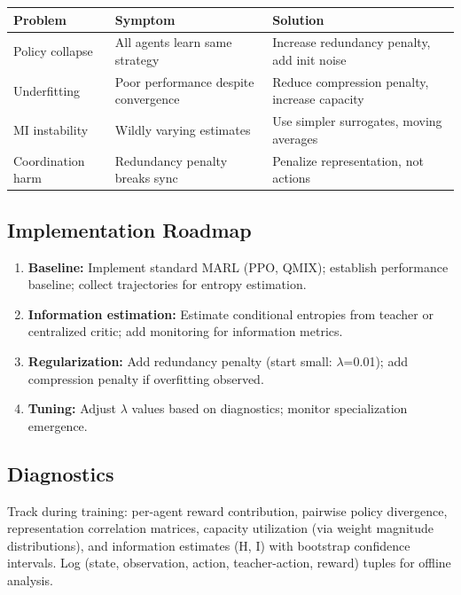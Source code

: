\documentclass[10pt, letterpaper]{article}
\begin{document}
\begin{center}
\begin{tabular}{lll}
\toprule
\textbf{Problem} & \textbf{Symptom} & \textbf{Solution} \\
\midrule
Policy collapse & All agents learn same strategy & Increase redundancy penalty, add init noise \\
Underfitting & Poor performance despite convergence & Reduce compression penalty, increase capacity \\
MI instability & Wildly varying estimates & Use simpler surrogates, moving averages \\
Coordination harm & Redundancy penalty breaks sync & Penalize representation, not actions \\
\bottomrule
\end{tabular}
\end{center}

\subsection{Implementation Roadmap}

\begin{enumerate}
    \item \textbf{Baseline:} Implement standard MARL (PPO, QMIX); establish performance baseline; collect trajectories for entropy estimation.
    \item \textbf{Information estimation:} Estimate conditional entropies from teacher or centralized critic; add monitoring for information metrics.
    \item \textbf{Regularization:} Add redundancy penalty (start small: $\lambda$=0.01); add compression penalty if overfitting observed.
    \item \textbf{Tuning:} Adjust $\lambda$ values based on diagnostics; monitor specialization emergence.
\end{enumerate}

\subsection{Diagnostics}

Track during training: per-agent reward contribution, pairwise policy divergence, representation correlation matrices, capacity utilization (via weight magnitude distributions), and information estimates (H, I) with bootstrap confidence intervals. Log (state, observation, action, teacher-action, reward) tuples for offline analysis.
\end{document}
